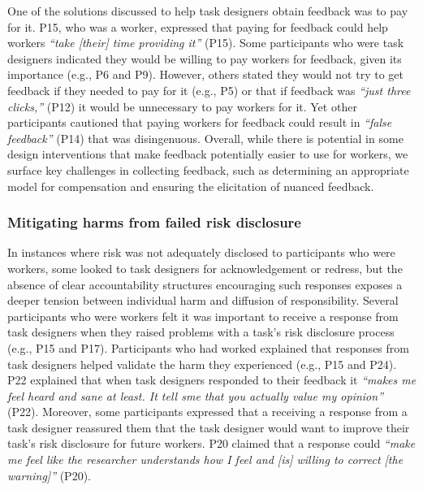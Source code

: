One of the solutions discussed to help task designers obtain feedback was to pay for it. P15, who was a worker, expressed that paying for feedback could help workers \textit{``take [their] time providing it''} (P15). Some participants who were task designers indicated they would be willing to pay workers for feedback, given its importance (e.g., P6 and P9). However, others stated they would not try to get feedback if they needed to pay for it (e.g., P5) or that if feedback was \textit{``just three clicks,''} (P12) it would be unnecessary to pay workers for it. Yet other participants cautioned that paying workers for feedback could result in \textit{``false feedback''} (P14) that was disingenuous. Overall, while there is potential in some design interventions that make feedback potentially easier to use for workers, we surface key challenges in collecting feedback, such as determining an appropriate model for compensation and ensuring the elicitation of nuanced feedback. 


\subsubsection{Mitigating harms from failed risk disclosure}
In instances where risk was not adequately disclosed to participants who were workers, some looked to task designers for acknowledgement or redress, but the absence of clear accountability structures encouraging such responses exposes a deeper tension between individual harm and diffusion of responsibility. Several participants who were workers felt it was important to receive a response from task designers when they raised problems with a task's  risk disclosure process (e.g., P15 and P17). Participants who had worked explained that responses from task designers helped validate the harm they experienced (e.g., P15 and P24). P22 explained that when task designers responded to their feedback it \textit{``makes me feel heard and sane at least. It tell sme that you actually value my opinion''} (P22). Moreover, some participants expressed that a receiving a response from a task designer reassured them that the task designer would want to improve their task's risk disclosure for future workers. P20 claimed that a response could \textit{``make me feel like the researcher understands how I feel and [is] willing to correct [the warning]''} (P20). 

